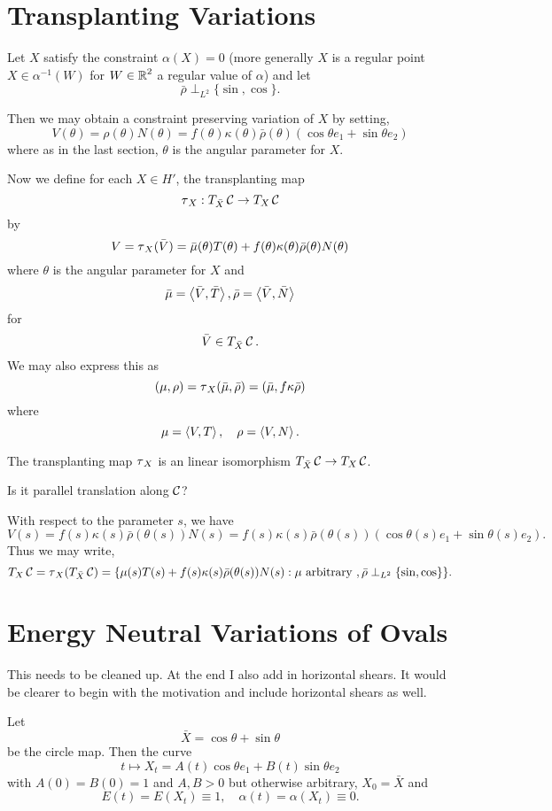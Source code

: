 \documentclass[12pt]{article}
\begin{document}
\section{Transplanting Variations}

Let \(X\) satisfy the constraint \(\alpha(X) = 0\) (more generally \(X\) is a regular point \(X \in \alpha^{-1} (W)\) for \(W \in \operatorname{\mathbb{R}}^2\) a regular value of \(\alpha\)) and let
\[
\bar{\rho} \perp_{L^2} \{\sin, \cos\}.
\]

Then we may obtain a constraint preserving variation of \(X\) by setting,
\[
V(\theta) = \rho(\theta) N(\theta) = f(\theta) \kappa(\theta) \bar{\rho}(\theta) (\cos\theta e_1 + \sin\theta e_2)
\]
where as in the last section, \(\theta\) is the angular parameter for \(X\).

Now we define for each \(X \in H'\), the transplanting map
\[
\operatorname{\tau}_X : T_{\bar{X}} \operatorname{\mathcal{C}} \to T_X \operatorname{\mathcal{C}}
\]
by
\[
V = \operatorname{\tau}_X(\bar{V}) = \bar{\mu}(\theta) T(\theta) + f(\theta)\kappa(\theta)\bar{\rho}(\theta) N(\theta)
\]
where \(\theta\) is the angular parameter for \(X\) and
\[
\bar{\mu} = \left\langle{\bar{V}},{\bar{T}}\right\rangle, \bar{\rho} = \left\langle{\bar{V}},{\bar{N}}\right\rangle
\]
for
\[
\bar{V} \in T_{\bar{X}} \operatorname{\mathcal{C}}.
\]
We may also express this as
\[
(\mu, \rho) = \operatorname{\tau}_X(\bar{\mu}, \bar{\rho}) = (\bar{\mu}, f\kappa\bar{\rho})
\]
where
\[
\mu = \left\langle{V},{T}\right\rangle, \quad \rho = \left\langle{V},{N}\right\rangle.
\]

The transplanting map \(\operatorname{\tau}_X\) is an linear isomorphism \(T_{\bar{X}} \operatorname{\mathcal{C}} \to T_X \operatorname{\mathcal{C}}\).

{\color{red} Is it parallel translation along \(\operatorname{\mathcal{C}}\)?}

With respect to the parameter \(s\), we have
\[
V(s) = f(s) \kappa(s) \bar{\rho}(\theta(s)) N(s) = f(s) \kappa(s) \bar{\rho}(\theta(s))(\cos\theta(s) e_1 + \sin\theta(s) e_2).
\]
Thus we may write,
\[
T_X \operatorname{\mathcal{C}} = \operatorname{\tau}_X(T_{\bar{X}} \operatorname{\mathcal{C}}) = \{\mu(s) T(s) + f(s) \kappa(s) \bar{\rho}(\theta(s)) N(s) : \mu \text{ arbitrary }, \bar{\rho} \perp_{L^2} \{\sin, \cos\}\}.
\]

\section{Energy Neutral Variations of Ovals}

{\color{red} This needs to be cleaned up. At the end I also add in horizontal shears. It would be clearer to begin with the motivation and include horizontal shears as well.}

Let
\[
\bar{X} = \cos\theta + \sin \theta
\]
be the circle map. Then the curve
\[
t \mapsto X_t = A(t) \cos\theta e_1 + B(t) \sin \theta e_2
\]
with \(A(0) = B(0) = 1\) and \(A, B > 0\) but otherwise arbitrary, \(X_0 = \bar{X}\) and
\[
E(t) = E(X_t) \equiv 1, \quad \alpha(t) = \alpha(X_t) \equiv 0.
\]
\end{document}
